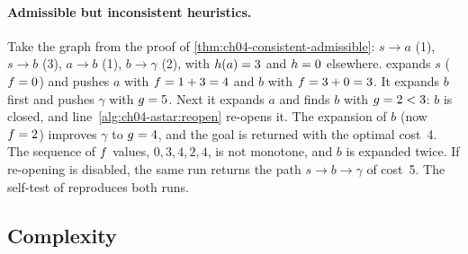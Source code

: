 \paragraph{Admissible but inconsistent heuristics.}
Take the graph from the proof of \cref{thm:ch04-consistent-admissible}:
$s \to a$ (1), $s \to b$ (3), $a \to b$ (1), $b \to \gamma$ (2), with
$h(a) = 3$ and $h = 0$ elsewhere. \astar expands $s$
($f = 0$) and pushes $a$ with $f = 1 + 3 = 4$ and $b$ with
$f = 3 + 0 = 3$. It expands $b$ first and pushes $\gamma$ with
$g = 5$. Next it expands $a$ and finds $b$ with $g = 2 < 3$: $b$ is
closed, and line~\ref{alg:ch04-astar:reopen} re-opens it. The expansion of $b$
(now $f = 2$) improves $\gamma$ to $g = 4$, and the goal is
returned with the optimal cost~4. The sequence of $f$ values,
$0, 3, 4, 2, 4$, is not monotone, and $b$ is expanded twice. If re-opening is
disabled, the same run returns the path $s \to b \to \gamma$ of cost~5. The
self-test of  reproduces both runs.

\subsection{Complexity}

